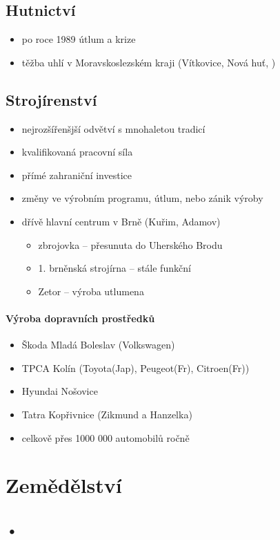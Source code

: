 \subsection{Hutnictví}
\begin{itemize}
\item po roce 1989 útlum a krize
\item těžba uhlí v Moravskoslezském kraji (Vítkovice, Nová huť, )
\end{itemize}

\subsection{Strojírenství}
\begin{itemize}
\item nejrozšířenšjší odvětví s mnohaletou tradicí
\item kvalifikovaná pracovní síla
\item přímé zahraniční investice
\item změny ve výrobním programu, útlum, nebo zánik výroby
\item dřívě hlavní centrum v Brně (Kuřim, Adamov)
	\begin{itemize}
	\item zbrojovka -- přesunuta do Uherského Brodu
	\item 1. brněnská strojírna -- stále funkční
	\item Zetor -- výroba utlumena
	\end{itemize}
\end{itemize}

\paragraph{Výroba dopravních prostředků}
\begin{itemize}
\item Škoda Mladá Boleslav (Volkswagen)
\item TPCA Kolín (Toyota(Jap), Peugeot(Fr), Citroen(Fr))
\item Hyundai Nošovice
\item Tatra Kopřivnice (Zikmund a Hanzelka)
\item celkově přes 1000 000 automobilů ročně
\end{itemize}


\section{Zemědělství}
\subsection{•}
